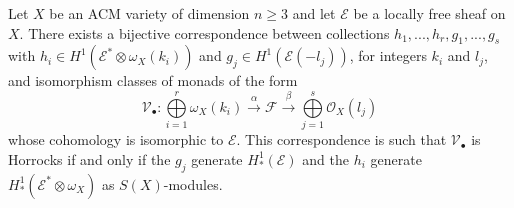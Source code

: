 \documentclass[
	oldfontcommands,
	sumario=abnt-6027-2012,
	12pt,			%
	openright,		%
	oneside,		%
	a4paper,		%
	english,		%
	brazil			%
	]{imecc-unicamp}
\begin{document}
\begin{theorem}\cite[Jardim \& Martins, Theorem 2.3]{jardim2}\label{Horrocks1}
Let $X$ be an ACM variety of dimension $n \geq 3$ and let $\mathcal{E}$ be a locally free sheaf on $X$. There exists a bijective correspondence between collections {$h_1,...,h_r,g_1,...,g_s$} with $h_i \in H^1(\mathcal{E}^* \otimes \omega_X (k_i))$ and $g_j \in H^1(\mathcal{E}(-l_j))$, for integers $k_i$ and $l_j$, and isomorphism classes of monads of the form
\begin{equation}\label{eqhorrocks}
\mathcal{V}_\bullet : \bigoplus\limits_{i=1}^r \omega_X (k_i) \overset{ \alpha }{ \to} \mathcal{F} \overset{ \beta }{ \to} \bigoplus\limits_{j=1}^s \mathcal{O}_X (l_j)
\end{equation}
whose cohomology is isomorphic to $\mathcal{E}$. This correspondence is such that $\mathcal{V}_\bullet$ is Horrocks if and only if the $g_j$ generate $H^1_{*}(\mathcal{E})$ and the $h_i$ generate $H^1_{*}(\mathcal{E}^* \otimes \omega_X)$ as $S(X)$-modules.
\end{theorem}
\end{document}
